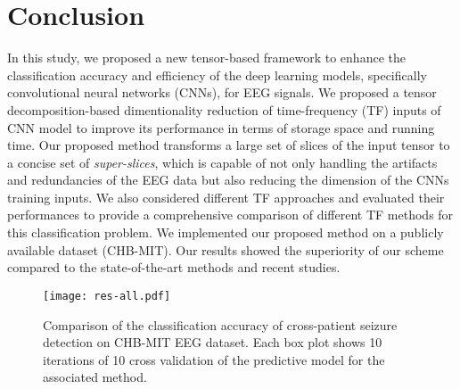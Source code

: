 \documentclass{article}
\begin{document}
\section{Conclusion}
\vspace{-5pt}
In this study, we proposed a new tensor-based framework to enhance the classification accuracy and efficiency of the deep learning models, specifically convolutional neural networks (CNNs), for EEG signals. We proposed a tensor decomposition-based dimentionality reduction of time-frequency (TF) inputs of CNN model to improve its performance in terms of storage space and running time. Our proposed method transforms a large set of slices of the input tensor to a concise set of \emph{super-slices}, which is capable of not only handling the artifacts and redundancies of the EEG data but also reducing the dimension of the CNNs training inputs. We also considered different TF approaches and evaluated their performances to provide a comprehensive comparison of different TF methods for this classification problem. We implemented our proposed method on a publicly available dataset (CHB-MIT). Our results showed the superiority of our scheme compared to the state-of-the-art methods and recent studies. 
\vspace{-9pt}
\begin{figure}[t]
\centerline{\texttt{[image: res-all.pdf]}}
\vspace{-3mm}
\caption{\small{Comparison of the classification accuracy of cross-patient seizure detection on CHB-MIT EEG dataset. Each box plot shows 10 iterations of 10 cross validation of the predictive model for the associated method.}}
\vspace{-3mm}
\label{res_all}
\end{figure}
\end{document}

